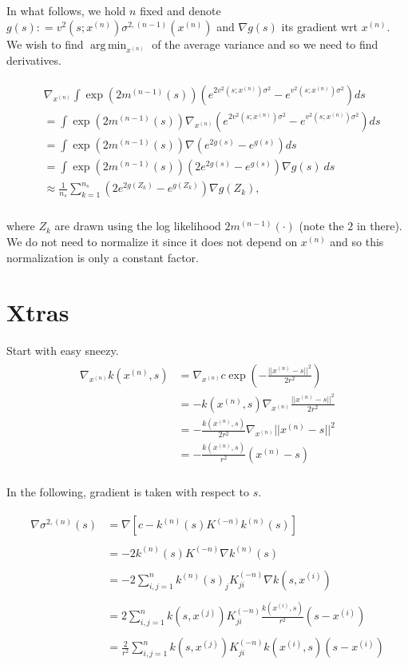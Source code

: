 \documentclass[paper=a4, fontsize=11pt]{scrartcl} %
\DeclareMathOperator*{\argmin}{arg\,min}
\numberwithin{equation}{section} %
\numberwithin{figure}{section} %
\numberwithin{table}{section} %
\newcommand{\gxn}{\nabla_{x^{(n)}}} %
\newcommand{\xn}{x^{(n)}} %
\newcommand{\xj}{x^{(j)}}
\newcommand{\xii}{x^{(i)}}
\newcommand{\mnm}{m^{(n-1)}}
\newcommand{\kn}{k^{(n)}}
\newcommand{\Kinvn}{K^{(-n)}} %
\newcommand{\sqn}{\sigma ^{2 , (n)}     }
\newcommand{\sqnm}{\sigma ^{2 , (n-1)}     }
\newcommand{\vnssqr}{v^2(s;\xn)}
\begin{document}
In what follows, we hold $n$ fixed and denote $g(s) : = \vnssqr \sqnm(\xn)$ and $\nabla g(s)$ its gradient wrt $\xn$. We wish to find 
$\argmin_{\xn}$ of the average variance and so we need to find derivatives.

\begin{align}
 \begin{split}
 & \gxn \int \exp(2\mnm(s)) (e^{2\vnssqr \sigma^2 } - e^{\vnssqr\sigma^2 }) ds \\
%
%
% 
&=  \int \exp(2\mnm(s)) \gxn (e^{2\vnssqr\sigma^2 } - e^{\vnssqr\sigma^2 }) ds \\
%
%
%
%
%
% 
&=  \int \exp(2\mnm(s)) \nabla (e^{2g(s) } - e^{g(s)}) ds \\
%
%
% 
%
%
%
% 
&=  \int \exp(2\mnm(s)) (2e^{2g(s) } - e^{g(s)})\nabla g(s)\  ds \\
%
%
% 
%
%
%
% 
&\approx \frac{1}{n_s}  \sum_{k=1}^{n_s} (2e^{2g(Z_k) } - e^{g(Z_k)})\nabla g(Z_k), \\
%
%
% 
 \end{split}
\end{align}

where $Z_k$ are drawn using the log likelihood $2\mnm(\cdot)$ (note the $2$ in there). We do not need to normalize it since it does not depend 
on $\xn$ and so this normalization is only a constant factor.


\section{Xtras}
Start with easy sneezy.
\begin{align}
 \begin{split}
  \gxn k(\xn,s) &= \gxn c\exp(-\frac{||\xn - s||^2}{2r^2} )\\
%
&= -k(\xn,s) \gxn\frac{||\xn - s||^2}{2r^2} \\
%
&= -\frac{k(\xn,s)}{2r^2} \gxn||\xn - s||^2 \\
%
&= -\frac{k(\xn ,s)}{r^2} (\xn-s)\\
 \end{split}
\end{align}

In the following, gradient is taken with respect to $s$.

\begin{align}
 \begin{split}
  \nabla \sqn (s) &= \nabla [ c - \kn(s) \Kinvn \kn(s)]\\\\
%
%
%
&= -2 \kn(s) \Kinvn \nabla\kn(s)\\\\
%
%
%
&= -2 \sum_{i,j=1}^{n} \kn(s)_j \Kinvn_{ji} \nabla k (s, \xii )\\\\
%
%
%
&= 2 \sum_{i,j=1}^{n} k(s,\xj) \Kinvn_{ji} \frac{k(\xii ,s)}{r^2} (s-\xii)\\\\
%
%
%
&= \frac{2}{r^2} \sum_{i,j=1}^{n} k(s,\xj) \Kinvn_{ji} k(\xii ,s) (s-\xii)\\\\
 \end{split}
\end{align}
\end{document}
